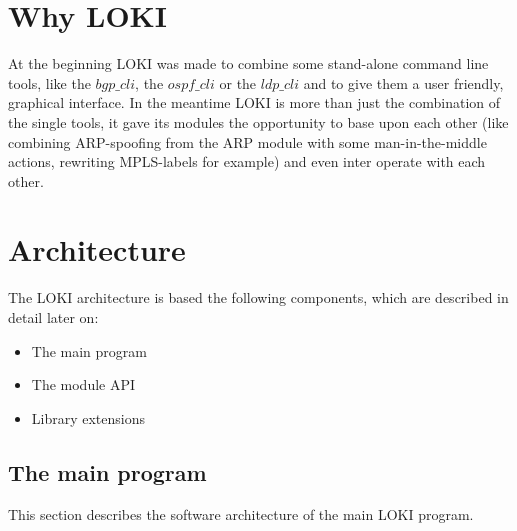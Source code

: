 \documentclass[a4paper, 11pt]{article}
\begin{document}
    \tableofcontents
    \newpage

    \section{Why LOKI}

    At the beginning LOKI was made to combine some stand-alone command line tools, like the $bgp\_cli$, the $ospf\_cli$ or the $ldp\_cli$ and to give them a user friendly, graphical interface. In the meantime LOKI is more than just the combination of the single tools, it gave its modules the opportunity to base upon each other (like combining ARP-spoofing from the ARP module with some man-in-the-middle actions, rewriting MPLS-labels for example) and even inter operate with each other.

    \section{Architecture}

        The LOKI architecture is based the following components, which are described in detail later on:
    
        \begin{itemize}
            \item The main program
            \item The module API
            \item Library extensions
        \end{itemize}

        \subsection{The main program}
        This section describes the software architecture of the main LOKI program.
        
\end{document}
